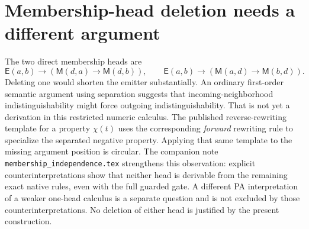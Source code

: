\documentclass[11pt]{article}
\newcommand{\M}{\mathsf M}
\newcommand{\E}{\mathsf E}
\begin{document}
\section{Membership-head deletion needs a different argument}

The two direct membership heads are
\[
 \E(a,b)\to(\M(d,a)\to\M(d,b)),\qquad
 \E(a,b)\to(\M(a,d)\to\M(b,d)).
\]
Deleting one would shorten the emitter substantially.  An ordinary
first-order semantic argument using separation suggests that
incoming-neighborhood indistinguishability might force outgoing
indistinguishability.  That is not yet a derivation in this restricted
numeric calculus.  The published reverse-rewriting template for a
property $\chi(t)$ uses the corresponding \emph{forward} rewriting
rule to specialize the separated negative property.  Applying that
same template to the missing argument position is circular.
The companion note \texttt{membership\_independence.tex} strengthens this
observation: explicit counterinterpretations show that neither head is
derivable from the remaining exact native rules, even with the full
guarded gate. A different PA interpretation of a weaker one-head calculus
is a separate question and is not excluded by those counterinterpretations.
No deletion of either head is justified by the present construction.
\end{document}
